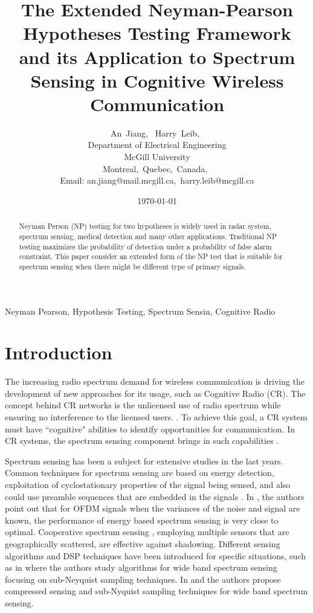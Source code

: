 \documentclass[12pt,journal,a4paper,twoside,onecolumn,draft]{IEEEtran}
\author{An~Jiang,~
        Harry~Leib,~\\
          Department of Electrical Engineering\\
          McGill University\\
          Montreal,~Quebec,~Canada,~\\
          Email: an.jiang@mail.mcgill.ca,~harry.leib@mcgill.ca
}
\title{The Extended Neyman-Pearson Hypotheses Testing Framework and its Application to Spectrum Sensing in Cognitive Wireless Communication}
\date{\today}
\begin{document}
\begin{spacing}{2.5}
\maketitle
\begin{abstract}
Neyman Person (NP) testing for two hypotheses is widely used in radar system, spectrum sensing, medical detection and many other applications. Traditional NP testing maximizes the probability of detection under a probability of false alarm constraint. This paper consider an extended form of the NP test that is suitable for spectrum sensing when there might be different type of primary signals.
\end{abstract}

\begin{IEEEkeywords}
Neyman Pearson, Hypothesis Testing, Spectrum Sensin, Cognitive Radio
\end{IEEEkeywords}

\section{Introduction}
The increasing radio spectrum demand for wireless communication is driving the development of new approaches for its usage, such as Cognitive Radio (CR)\cite{a001}. The concept behind CR networks is the unlicensed use of radio spectrum while ensuring no interference to the licensed users. \cite{goldsmith2009breaking}.
To achieve this goal, a CR system must have ``cognitive" abilities to identify opportunities for communication\cite{buddhikot2007understanding}. In CR systems, the spectrum sensing component brings in such capabilities \cite{tandra2009spectrum}.

 Spectrum sensing has been a subject for extensive studies in the last years\cite{axell2012spectrum}. Common techniques for spectrum sensing are based on energy detection, exploitation of cyclostationary properties of  the signal being sensed, and also could use preamble sequences that are embedded in the signals \cite{cabric2004implementation}.  In \cite{axell2011optimal}, the authors point out that for OFDM signals when the variances of the noise and signal are known, the performance of energy based spectrum sensing is very close to optimal. Cooperative spectrum sensing \cite{ganesan2005cooperative}, employing multiple sensors that are geographically scattered, are effective against shadowing.
Different sensing algorithms and DSP techniques have been introduced for specific situations, such as in \cite{tian2007compressed} where the authors study algorithms for wide band spectrum sensing focusing on sub-Neyquist sampling techniques. In  \cite{sun2013wideband} and  \cite{sun2013wideband2} the authors propose compressed sensing and sub-Nyquist sampling techniques for wide band spectrum sensing.


\end{spacing}
\end{document}
